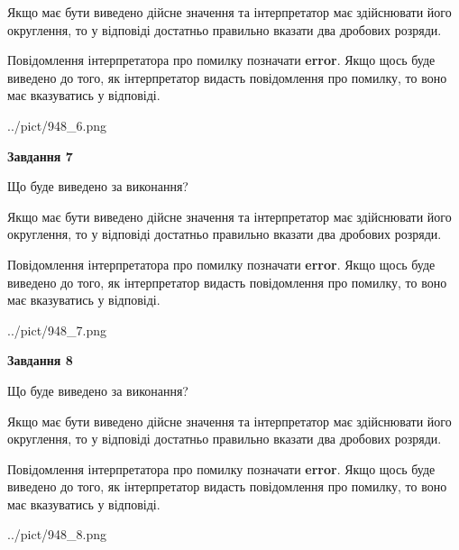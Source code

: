 \documentclass[12pt, ukrainian]{article}
\begin{document}
{\begin {Large}
Якщо має бути виведено дійсне значення та інтерпретатор має здійснювати його округлення, 
то у відповіді достатньо правильно вказати два дробових розряди.

Повідомлення інтерпретатора про помилку позначати \textbf{error}.
Якщо щось буде виведено до того, як інтерпретатор видасть повідомлення про помилку, 
то воно має вказуватись у відповіді. \par

\begin{center}
	{../pict/948_6.png}
\end{center}
\newpage

{\begin {center}\textbf{Завдання 7}\end {center}}\par
Що буде виведено за виконання? \par

Якщо має бути виведено дійсне значення та інтерпретатор має здійснювати його округлення, 
то у відповіді достатньо правильно вказати два дробових розряди.

Повідомлення інтерпретатора про помилку позначати \textbf{error}.
Якщо щось буде виведено до того, як інтерпретатор видасть повідомлення про помилку, 
то воно має вказуватись у відповіді. \par

\begin{center}
	{../pict/948_7.png}
\end{center}
\newpage

{\begin {center}\textbf{Завдання 8}\end {center}}\par
Що буде виведено за виконання? \par

Якщо має бути виведено дійсне значення та інтерпретатор має здійснювати його округлення, 
то у відповіді достатньо правильно вказати два дробових розряди.

Повідомлення інтерпретатора про помилку позначати \textbf{error}.
Якщо щось буде виведено до того, як інтерпретатор видасть повідомлення про помилку, 
то воно має вказуватись у відповіді. \par

\begin{center}
	{../pict/948_8.png}
\end{center}
\newpage


\end{Large}}
\end{document}
